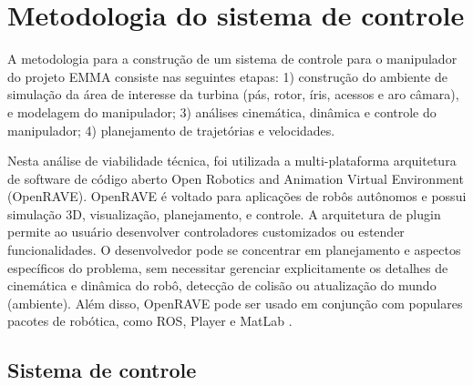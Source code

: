 \section{Metodologia do sistema de controle}
A metodologia para a construção de um sistema de controle para o manipulador do
projeto EMMA consiste nas seguintes etapas: 1) construção do ambiente de
simulação da área de interesse da turbina (pás, rotor, íris, acessos e aro
câmara), e modelagem do manipulador; 3) análises cinemática, dinâmica e
controle do manipulador; 4) planejamento de trajetórias e velocidades.

Nesta análise de viabilidade técnica, foi utilizada a 
multi-plataforma arquitetura de software de código aberto Open
Robotics and Animation Virtual Environment (OpenRAVE). OpenRAVE é voltado para
aplicações de robôs autônomos e possui simulação 3D, visualização, planejamento,
e controle. A arquitetura de plugin permite ao usuário desenvolver controladores
customizados ou estender funcionalidades. O desenvolvedor pode se
concentrar em planejamento e aspectos específicos do problema, sem necessitar
gerenciar explicitamente os detalhes de cinemática e dinâmica do robô,
detecção de colisão ou atualização do mundo (ambiente). Além disso, OpenRAVE
pode ser usado em conjunção com populares pacotes de robótica, como ROS, Player e MatLab
\cite{diankov2008openrave}. 









\subsection{Sistema de controle}

